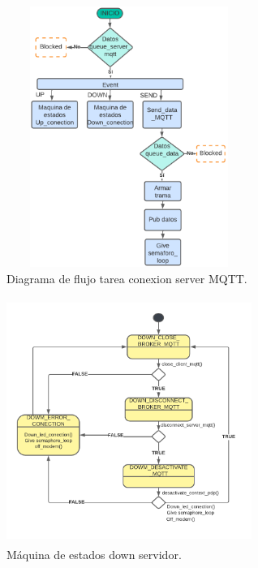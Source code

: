 \begin{figure}[h]
  \centering
	\includegraphics[width=8cm, height=8.5cm]{./Figures/DF general task conection.png}
	\caption{Diagrama de flujo tarea conexion server MQTT.}
	\label{fig:Df tarea conexion}
\end{figure}

\begin{figure}[h]
  \centering
  \includegraphics[width=8cm, height=8cm]{./Figures/SM down server.png}
  \caption{Máquina de estados down servidor.}
  \label{fig:Maquina de estados dowm servidor}
\end{figure}
\clearpage
\hspace{0.5cm}

